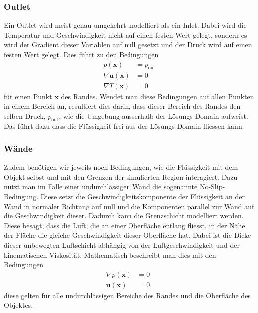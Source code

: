 \subsubsection{Outlet}
%
Ein Outlet wird meist genau umgekehrt modelliert als ein Inlet.
Dabei wird die Temperatur und Geschwindigkeit nicht auf einen festen Wert gelegt, sondern es wird der Gradient dieser Variablen auf null gesetzt und der Druck wird auf einen festen Wert gelegt.
Dies führt zu den Bedingungen
\begin{align*}
 p(\mathbf{x}) &= p_{\text{out}} \\
 \nabla\mathbf{u}(\mathbf{x}) &= 0 \\
 \nabla T(\mathbf{x}) &= 0
\end{align*}
für einen Punkt $\mathbf{x}$ des Randes.
Wendet man diese Bedingungen auf allen Punkten in einem Bereich an, resultiert dies darin, dass dieser Bereich des Randes den selben Druck, $p_{\text{out}}$,  wie die Umgebung ausserhalb der Lösungs-Domain aufweist.
Das führt dazu dass die Flüssigkeit frei aus der Lösungs-Domain fliessen kann.

\subsubsection{Wände}
Zudem benötigen wir jeweils noch Bedingungen, wie die Flüssigkeit mit dem Objekt selbst und mit den Grenzen der simulierten Region interagiert.
Dazu nutzt man im Falle einer undurchlässigen Wand die sogenannte No-Slip-Bedingung. 
Diese setzt die Geschwindigkeitskomponente der Flüssigkeit an der Wand in normaler Richtung auf null und die Komponenten parallel zur Wand auf die Geschwindigkeit dieser.
Dadurch kann die Grenzschicht modelliert werden. Diese besagt, dass die Luft, die an einer Oberfläche entlang fliesst, in der Nähe der Fläche die gleiche Geschwindigkeit dieser Oberfläche hat.
Dabei ist die Dicke dieser unbewegten Luftschicht abhängig von der Luftgeschwindigkeit und der kinematischen Viskosität.
Mathematisch beschreibt man dies mit den Bedingungen
\begin{align*}
 \nabla p(\mathbf{x}) &= 0 \\
\mathbf{u}(\mathbf{x}) &= 0 ,
\end{align*}
diese gelten für alle undurchlässigen Bereiche des Randes und die Oberfläche des Objektes.

